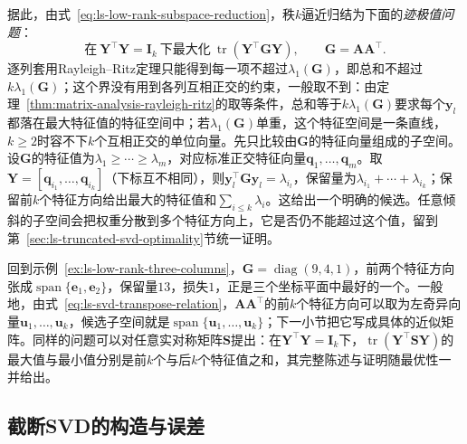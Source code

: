 据此，由式~\eqref{eq:ls-low-rank-subspace-reduction}，秩$k$逼近归结为下面的\emph{迹极值问题}：
\[
 \text{在}\ \bm Y^\top\bm Y=\bm I_k\ \text{下最大化}\ \operatorname{tr}(\bm Y^\top\bm G\bm Y),\qquad\bm G=\bm A\bm A^\top .
\]
逐列套用Rayleigh--Ritz定理只能得到每一项不超过$\lambda_1(\bm G)$，即总和不超过$k\lambda_1(\bm G)$；这个界没有用到各列互相正交的约束，一般取不到：由定理~\ref{thm:matrix-analysis-rayleigh-ritz}的取等条件，总和等于$k\lambda_1(\bm G)$要求每个$\bm y_l$都落在最大特征值的特征空间中；若$\lambda_1(\bm G)$单重，这个特征空间是一条直线，$k\geq2$时容不下$k$个互相正交的单位向量。先只比较由$\bm G$的特征向量组成的子空间。设$\bm G$的特征值为$\lambda_1\geq\cdots\geq\lambda_m$，对应标准正交特征向量$\bm q_1,\ldots,\bm q_m$。取$\bm Y=[\bm q_{i_1},\ldots,\bm q_{i_k}]$（下标互不相同），则$\bm y_l^\top\bm G\bm y_l=\lambda_{i_l}$，保留量为$\lambda_{i_1}+\cdots+\lambda_{i_k}$；保留前$k$个特征方向给出最大的特征值和$\sum_{i\leq k}\lambda_i$。这给出一个明确的候选。任意倾斜的子空间会把权重分散到多个特征方向上，它是否仍不能超过这个值，留到第~\ref{sec:ls-truncated-svd-optimality}节统一证明。

回到示例~\ref{ex:ls-low-rank-three-columns}，$\bm G=\operatorname{diag}(9,4,1)$，前两个特征方向张成$\operatorname{span}\{\bm e_1,\bm e_2\}$，保留量$13$，损失$1$，正是三个坐标平面中最好的一个。一般地，由式~\eqref{eq:ls-svd-transpose-relation}，$\bm A\bm A^\top$的前$k$个特征方向可以取为左奇异向量$\bm u_1,\ldots,\bm u_k$，候选子空间就是$\operatorname{span}\{\bm u_1,\ldots,\bm u_k\}$；下一小节把它写成具体的近似矩阵。同样的问题可以对任意实对称矩阵$\bm S$提出：在$\bm Y^\top\bm Y=\bm I_k$下，$\operatorname{tr}(\bm Y^\top\bm S\bm Y)$的最大值与最小值分别是前$k$个与后$k$个特征值之和，其完整陈述与证明随最优性一并给出。

\subsection{截断SVD的构造与误差}
\label{sec:ls-truncated-svd-construction}

